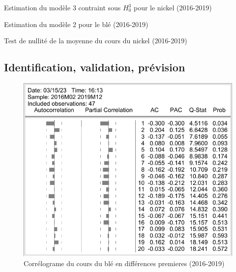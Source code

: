 \documentclass[12pt,a4paper]{article}
\begin{document}
\begin{table}[H]
    \centering
    \caption{Estimation du modèle 3 contraint sous $H_{0}^{3}$ pour le nickel (2016-2019)}
    \sffamily
    
    \label{tab:mod3cont_nickel19}
\end{table}

\begin{table}[H]
    \centering
    \caption{Estimation du modèle 2 pour le blé (2016-2019)}
    \sffamily
    
    \label{tab:mod2_nickel19}
\end{table}

\begin{table}[H]
    \centering
    \caption{Test de nullité de la moyenne du cours du nickel (2016-2019)}
    \sffamily
    
    \label{tab:testmoy_nickel19}
\end{table}

\subsection{Identification, validation, prévision}

\begin{figure}[H]
    \centering
    \label{fig:cor_dble19}
    \includegraphics[]{annexe/4_3_1_cor_dble19.pdf}
    \caption{Corrélograme du cours du blé en différences premieres (2016-2019)}
\end{figure}
\end{document}
